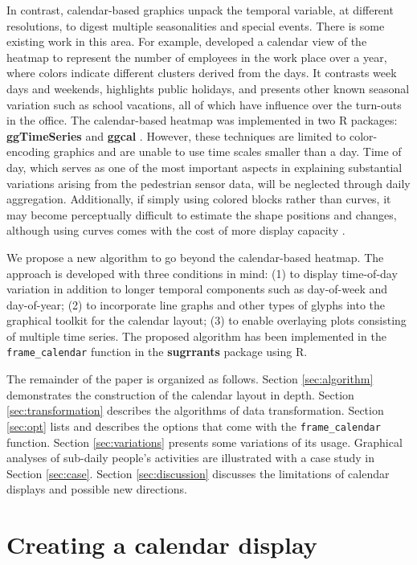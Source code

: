 \documentclass[12pt]{article}
\begin{document}
In contrast, calendar-based graphics unpack the temporal variable, at
different resolutions, to digest multiple seasonalities and special
events. There is some existing work in this area. For example,
\citet{VanWijkCluster1999} developed a calendar view of the heatmap to
represent the number of employees in the work place over a year, where
colors indicate different clusters derived from the days. It contrasts
week days and weekends, highlights public holidays, and presents other
known seasonal variation such as school vacations, all of which have
influence over the turn-outs in the office. The calendar-based heatmap
was implemented in two R packages: \textbf{ggTimeSeries}
\citep{R-ggTimeSeries} and \textbf{ggcal} \citep{R-ggcal}. However,
these techniques are limited to color-encoding graphics and are unable
to use time scales smaller than a day. Time of day, which serves as one
of the most important aspects in explaining substantial variations
arising from the pedestrian sensor data, will be neglected through daily
aggregation. Additionally, if simply using colored blocks rather than
curves, it may become perceptually difficult to estimate the shape
positions and changes, although using curves comes with the cost of more
display capacity \citep{cleveland1984graphical, lam2007overview}.

We propose a new algorithm to go beyond the calendar-based heatmap. The
approach is developed with three conditions in mind: (1) to display
time-of-day variation in addition to longer temporal components such as
day-of-week and day-of-year; (2) to incorporate line graphs and other
types of glyphs into the graphical toolkit for the calendar layout; (3)
to enable overlaying plots consisting of multiple time series. The
proposed algorithm has been implemented in the \texttt{frame\_calendar}
function in the \textbf{sugrrants} package using R.

The remainder of the paper is organized as follows. Section
\ref{sec:algorithm} demonstrates the construction of the calendar layout
in depth. Section \ref{sec:transformation} describes the algorithms of
data transformation. Section \ref{sec:opt} lists and describes the
options that come with the \texttt{frame\_calendar} function. Section
\ref{sec:variations} presents some variations of its usage. Graphical
analyses of sub-daily people's activities are illustrated with a case
study in Section \ref{sec:case}. Section \ref{sec:discussion} discusses
the limitations of calendar displays and possible new directions.

\hypertarget{creating-a-calendar-display}{%
\section{Creating a calendar
display}\label{creating-a-calendar-display}}
\end{document}
